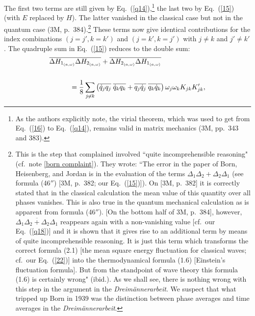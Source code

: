 \documentclass{elsart}
\begin{document}
The first two terms are still given by Eq.\ (\ref{q14}),\footnote{As the authors explicitly note, the virial theorem, which was used to get from Eq.\ (\ref{16}) to Eq.\ (\ref{q14}),  remains valid in matrix mechanics (3M, pp.\  343 and 383).} the last two by Eq.\ (\ref{15}) (with $E$ replaced by $H$). The latter vanished in the classical case but not in the quantum case (3M, p.\ 384).\footnote{\label{incomprehensible}This is the step that \citet[p.\ 263]{Born and Fuchs 1939a} complained involved ``quite incomprehensible reasoning" (cf.\ note \ref{born complaint}). They wrote: ``The error in the paper of Born, Heisenberg, and Jordan is in the evaluation of the terms $\Delta_1 \Delta_2 + \Delta_2 \Delta_1$ (see formula (46$''$) [3M, p.\ 382; our Eq.\ (\ref{15})]). On [3M, p.\ 382] it is correctly stated that in the classical calculation the mean value of this quantity over all phases vanishes. This is also true in the quantum mechanical calculation as is apparent from formula (46$''$). [On the bottom half of 3M, p.\ 384], however, $\overline{\Delta_1 \Delta_2 + \Delta_2 \Delta_1}$ reappears again with a non-vanishing value [cf.\ our Eq.\ (\ref{q18})] and it is shown that it gives rise to an additional term by means of quite incomprehensible reasoning. It is just this term which transforms the correct formula (2.1) [the mean square energy fluctuation for classical waves; cf.\ our Eq.\ (\ref{22})] into the thermodynamical formula (1.6) [Einstein's fluctuation formula]. But from the standpoint of wave theory this formula (1.6) is certainly wrong" (ibid.). As we shall see, there is nothing wrong with this step in the argument in the {\it Dreim\"annerarbeit}. We suspect that what tripped up Born in 1939 was the distinction between phase averages and time averages in the {\it Dreim\"annerarbeit}.}  These terms now give identical contributions for the index combinations $(j=j', k=k')$ and $(j=k', k=j')$ with $j \neq k$ and $j' \neq k'$. The quadruple sum in Eq.\ (\ref{15}) reduces to the double sum:
\begin{eqnarray}
\lefteqn{ \overline{\Delta H_{1_{(a, \omega)}} \Delta H_{2_{(a, \omega)}}} + \overline{\Delta H_{2_{(a, \omega)}} \Delta H_{1_{(a, \omega)}}} }
& & \nonumber \\
 \label{7a} \\ 
 & & \;\;\;\;\;\;\;\ =  \frac{1}{8} \sum_{ j \neq k} \left(  
\overline{ \dot{q}_j q_j } \; \overline{ \dot{q}_k q_k}
 + \overline{ q_j \dot{q}_j } \; \overline{q_k \dot{q}_k}
 \right) \omega_j \omega_k K_{jk} K'_{jk},
\nonumber
\end{eqnarray}
\end{document}
